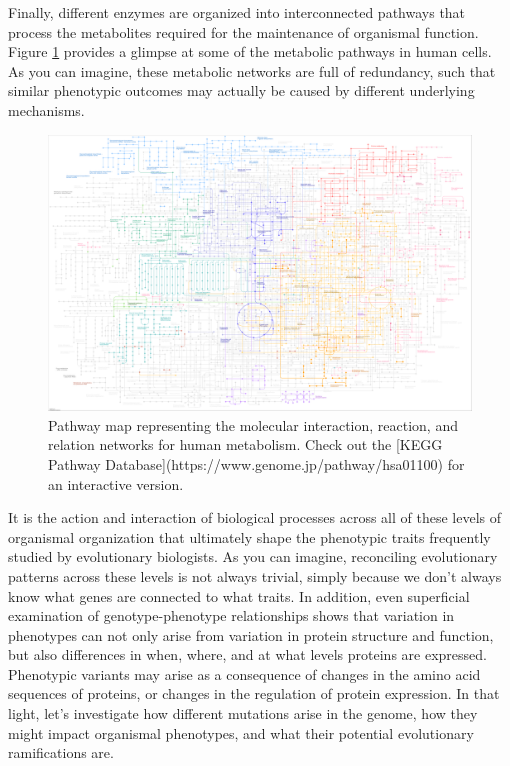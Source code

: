 \documentclass[
]{book}
\begin{document}
Finally, different enzymes are organized into interconnected pathways that process the metabolites required for the maintenance of organismal function. Figure \ref{fig:metabolism} provides a glimpse at some of the metabolic pathways in human cells. As you can imagine, these metabolic networks are full of redundancy, such that similar phenotypic outcomes may actually be caused by different underlying mechanisms.

\begin{figure}
\includegraphics[width=1\linewidth]{images/metabolic_pathway} \caption{Pathway map representing the molecular interaction, reaction, and relation networks for human metabolism. Check out the [KEGG Pathway Database](https://www.genome.jp/pathway/hsa01100) for an interactive version.}\label{fig:metabolism}
\end{figure}

It is the action and interaction of biological processes across all of these levels of organismal organization that ultimately shape the phenotypic traits frequently studied by evolutionary biologists. As you can imagine, reconciling evolutionary patterns across these levels is not always trivial, simply because we don't always know what genes are connected to what traits. In addition, even superficial examination of genotype-phenotype relationships shows that variation in phenotypes can not only arise from variation in protein structure and function, but also differences in when, where, and at what levels proteins are expressed. Phenotypic variants may arise as a consequence of changes in the amino acid sequences of proteins, or changes in the regulation of protein expression. In that light, let's investigate how different mutations arise in the genome, how they might impact organismal phenotypes, and what their potential evolutionary ramifications are.
\end{document}

